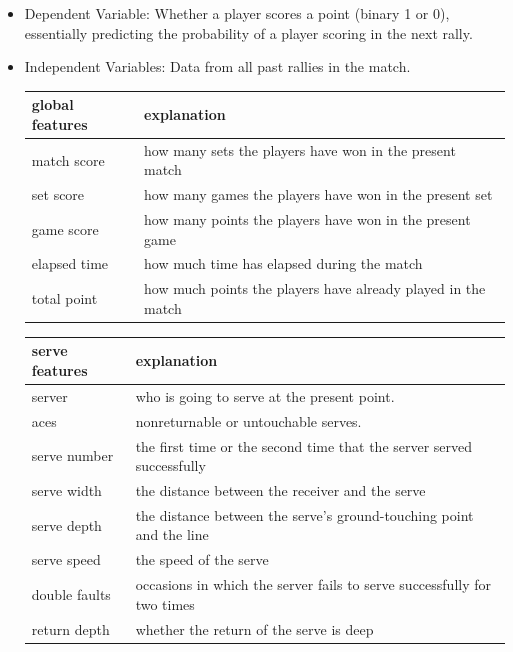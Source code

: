 \documentclass[UTF8]{mcmthesis}
\begin{document}
	\begin{itemize}
		\item Dependent Variable: Whether a player scores a point (binary 1 or 0), essentially predicting the probability of a player scoring in the next rally.
		\item Independent Variables: Data from all past rallies in the match.
	\begin{table}[!ht]
    \centering
    \begin{tabular}{|l|l|}
    \hline
        global features & explanation  \\ \hline
        match score & how many sets the players have won in the present match  \\ \hline
        set score & how many games the players have won in the present set  \\ \hline
        game score & how many points the players have won in the present game  \\ \hline
        elapsed time & how much time has elapsed during the match  \\ \hline
        total point & how much points the players have already played in the match  \\ \hline
    \end{tabular}
    \label{global features}
    \end{table}
    
    \begin{table}[!ht]
    \centering
    \begin{tabular}{|l|l|}
    \hline
        serve features & explanation  \\ \hline
        server & who is going to serve at the present point.  \\ \hline
        aces & nonreturnable or untouchable serves.  \\ \hline
        serve number  & the first time or the second time that the server served successfully  \\ \hline
        serve width & the distance between the receiver and the serve  \\ \hline
        serve depth & the distance between the serve's ground-touching point and the line  \\ \hline
        serve speed & the speed of the serve  \\ \hline
        double faults & occasions in which the server fails to serve successfully for two times  \\ \hline
        return depth & whether the return of the serve is deep  \\ \hline
    \end{tabular}
    \label{global features}
\end{table}
    

\end{itemize}
\end{document}
